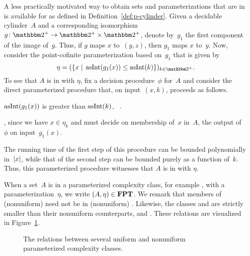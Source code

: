 \begin{example}
\label{ex:p-cylinder}%
  A less practically motivated way to obtain sets and parameterizations that are in  is available for  as defined in Definition~\ref{def:p-cylinder}.
  Given a decidable \pdash{}cylinder~$A$ and a corresponding isomorphism~$g\colon \binary^+ \to \binary^+ \times \binary^+$, denote by~$g_1$ the first component of the image of~$g$.
  Thus, if $g$ maps $x$ to~$(y, z)$, then $g_1$ maps $x$ to~$y$.
  Now, consider the point-cofinite parameterization based on~$g_1$ that is given by
  \begin{equation*}
    \eta \deq (\{x \st \asNat(g_1(x)) \le \asNat(k)\})_{k \in \binary^+}.
  \end{equation*}
  To see that $A$ is in  with $\eta$, fix a decision procedure~$\phi$ for~$A$ and consider the direct parameterized procedure that, on input~$(x, k)$, proceeds as follows.
  \begin{codelisting}
  \item
     $\asNat(g_1(x))$ is greater than $\asNat(k)$, ~.
  \item
    , since we have $x \in \eta_k$ and must decide on membership of~$x$ in~$A$,
    \itemcont {} the output of~$\phi$ on input~$g_1(x)$.
  \end{codelisting}
  The running time of the first step of this procedure can be bounded polynomially in~${\lvert x\rvert}$, while that of the second step can be bounded purely as a function of~$k$.
  Thus, this parameterized procedure witnesses that $A$ is in  with $\eta$.
\end{example}

When a set~$A$ is in a parameterized complexity class, for example , with a parameterization~$\eta$, we write $(A, \eta) \in \textnormal{\textbf{FPT}}$.
We remark that members of (nonuniform)  need not be in (nonuniform)  \parencite{downey1999parameterized,flum2006parameterized}.
Likewise, the classes  and  are strictly smaller than their nonuniform counterparts,  and  \parencite{downey1993fixed}.
These relations are visualized in Figure~\ref{fig:parameterized_classes}.
\begin{figure}[htbp]
  \centering
  \caption{
    The relations between several uniform and nonuniform parameterized complexity classes.
  }
  \label{fig:parameterized_classes}
\end{figure}
\FloatBarrier%

